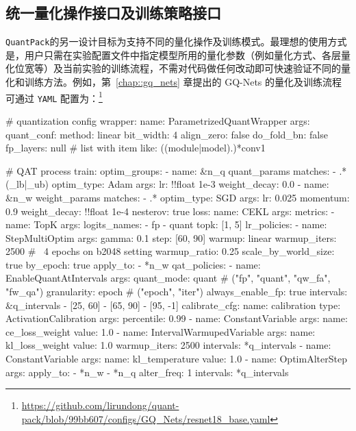 \documentclass[
]{shtthesis}
\providecommand{\QP}{\texttt{QuantPack}}
\begin{document}
\subsection{统一量化操作接口及训练策略接口} \label{sec::appendix::internal_interface}
\QP 的另一设计目标为支持不同的量化操作及训练模式。最理想的使用方式是，用户只需在实验配置文件中指定模型所用的量化参数（例如量化方式、各层量化位宽等）及当前实验的训练流程，不需对代码做任何改动即可快速验证不同的量化和训练方法。例如，第~\ref{chap::gq_nets} 章提出的 GQ-Nets 的量化及训练流程可通过 \verb|YAML| 配置为：\footnote{\url{https://github.com/lirundong/quant-pack/blob/99bb607/configs/GQ_Nets/resnet18_base.yaml}}
\begin{yaml}
# quantization config
wrapper:
  name: ParametrizedQuantWrapper
  args:
    quant_conf:
      method: linear
      bit_width: 4
      align_zero: false
    do_fold_bn: false
    fp_layers: null # list with item like: ((module|model).)*conv1

# QAT process
train:
  optim_groups:
    - name: &n_q quant_params
      matches:
        - .*(_lb|_ub)
      optim_type: Adam
      args:
        lr: !!float 1e-3
        weight_decay: 0.0
    - name: &n_w weight_params
      matches:
        - .*
      optim_type: SGD
      args:
        lr: 0.025
        momentum: 0.9
        weight_decay: !!float 1e-4
        nesterov: true
  loss:
    name: CEKL
    args: {}
  metrics:
    - name: TopK
      args:
        logits_names:
          - fp
          - quant
        topk: [1, 5]
  lr_policies:
    - name: StepMultiOptim
      args:
        gamma: 0.1
        step: [60, 90]
        warmup: linear
        warmup_iters: 2500  # ~4 epochs on b2048 setting
        warmup_ratio: 0.25
        scale_by_world_size: true
        by_epoch: true
        apply_to:
          - *n_w
  qat_policies:
    - name: EnableQuantAtIntervals
      args:
        quant_mode: quant  # ("fp", "quant", "qw_fa", "fw_qa")
        granularity: epoch  # ("epoch", "iter")
        always_enable_fp: true
        intervals: &q_intervals
          - [25, 60]
          - [65, 90]
          - [95, -1]
        calibrate_cfg:
          name: calibration
          type: ActivationCalibration
          args:
            percentile: 0.99
    - name: ConstantVariable
      args:
        name: ce_loss_weight
        value: 1.0
    - name: IntervalWarmupedVariable
      args:
        name: kl_loss_weight
        value: 1.0
        warmup_iters: 2500
        intervals: *q_intervals
    - name: ConstantVariable
      args:
        name: kl_temperature
        value: 1.0
    - name: OptimAlterStep
      args:
        apply_to:
          - *n_w
          - *n_q
        alter_freq: 1
        intervals: *q_intervals
\end{yaml}
\end{document}
